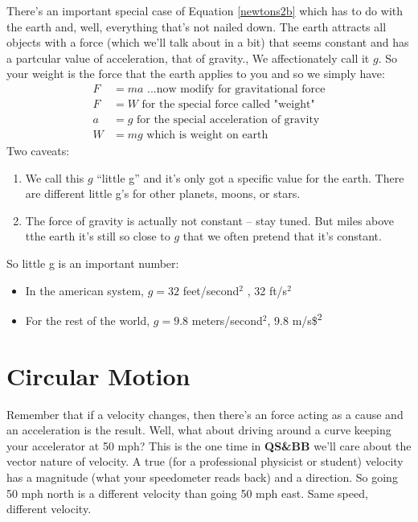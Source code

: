 \documentclass[
  letterpaper,
  DIV=11,
  numbers=noendperiod,
  oneside]{scrreprt}
\providecommand{\tightlist}{%
  \setlength{\itemsep}{0pt}\setlength{\parskip}{0pt}}\usepackage{longtable,booktabs,array}
\begin{document}
There's an important special case of Equation \eqref{newtons2b} which
has to do with the earth and, well, everything that's not nailed down.
The earth attracts all objects with a force (which we'll talk about in a
bit) that seems constant and has a partcular value of acceleration, that
of gravity., We affectionately call it \(g\). So your weight is the
force that the earth applies to you and so we simply have: \[
\begin{align}
F &= ma \text{ ...now modify for gravitational force}\nonumber \\
F &= W \text{ for the special force called "weight"} \nonumber \\
a &= g \text{ for the special acceleration of gravity} \nonumber\\
W &=mg \text{ which is weight on earth} \label{weight}
\end{align}
\] Two caveats:

\begin{enumerate}
\def\labelenumi{\arabic{enumi}.}
\tightlist
\item
  We call this \(g\) ``little g'' and it's only got a specific value for
  the earth. There are different little g's for other planets, moons, or
  stars.
\item
  The force of gravity is actually not constant -- stay tuned. But miles
  above tthe earth it's still so close to \(g\) that we often pretend
  that it's constant.
\end{enumerate}

So little g is an important number:

\begin{itemize}
\tightlist
\item
  In the american system, \(g = 32\) feet/second\(^2\) , 32 ft/s\(^2\)
\item
  For the rest of the world, \(g = 9.8\) meters/second\(^2\), 9.8
  m/s\$\textsuperscript{2}
\end{itemize}

\section{Circular Motion}\label{sec-circular}

Remember that if a velocity changes, then there's an force acting as a
cause and an acceleration is the result. Well, what about driving around
a curve keeping your accelerator at 50 mph? This is the one time in
\textbf{QS\&BB} we'll care about the vector nature of velocity. A true
(for a professional physicist or student) velocity has a magnitude (what
your speedometer reads back) and a direction. So going 50 mph north is a
different velocity than going 50 mph east. Same speed, different
velocity.
\end{document}
